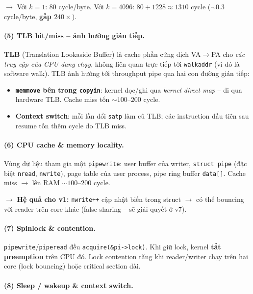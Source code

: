 \documentclass[11pt,a4paper]{article}
\begin{document}
$\rightarrow$ Với $k=1$: 80 cycle/byte. Với $k=4096$: $80 + 1228 \approx 1310$ cycle ($\sim 0.3$ cycle/byte, \textbf{gấp $240\times$}).

\paragraph{(5) TLB hit/miss -- ảnh hưởng gián tiếp.}
\textbf{TLB} (Translation Lookaside Buffer) là cache phần cứng dịch VA$\rightarrow$PA cho \emph{các truy cập của CPU đang chạy}, không liên quan trực tiếp tới \texttt{walkaddr} (vì đó là software walk). TLB ảnh hưởng tới throughput pipe qua hai con đường gián tiếp:

\begin{itemize}
  \item \textbf{\texttt{memmove} bên trong \texttt{copyin}}: kernel đọc/ghi qua \emph{kernel direct map} -- đi qua hardware TLB. Cache miss tốn $\sim 100$--$200$ cycle.
  \item \textbf{Context switch}: mỗi lần đổi \texttt{satp} làm cũ TLB; các instruction đầu tiên sau resume tốn thêm cycle do TLB miss.
\end{itemize}

\paragraph{(6) CPU cache \& memory locality.}
Vùng dữ liệu tham gia một \texttt{pipewrite}: user buffer của writer, \texttt{struct pipe} (đặc biệt \texttt{nread}, \texttt{nwrite}), page table của user process, pipe ring buffer \texttt{data[]}. Cache miss $\rightarrow$ lên RAM $\sim 100$--$200$ cycle.

$\rightarrow$ \textbf{Hệ quả cho v1:} \texttt{nwrite++} cập nhật biến trong struct $\rightarrow$ có thể bouncing với reader trên core khác (false sharing -- sẽ giải quyết ở v7).

\paragraph{(7) Spinlock \& contention.}
\texttt{pipewrite}/\texttt{piperead} đều \texttt{acquire(\&pi->lock)}. Khi giữ lock, kernel \textbf{tắt preemption} trên CPU đó. Lock contention tăng khi reader/writer chạy trên hai core (lock bouncing) hoặc critical section dài.

\paragraph{(8) Sleep / wakeup \& context switch.}
\end{document}
